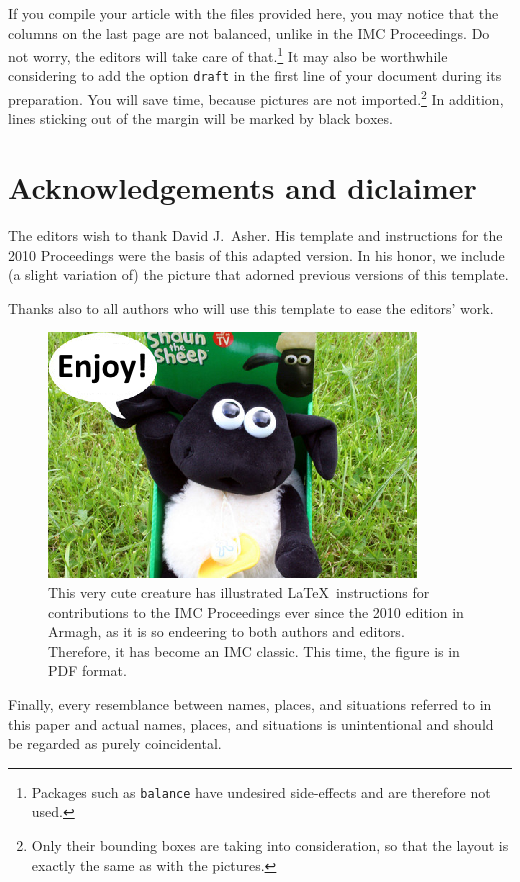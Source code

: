 \documentclass[10pt,a4paper,twoside]{article}
\begin{document}
\begin{IMCpaper}
If you compile your article with the files provided here, you may
notice that the columns on the last page are not balanced, unlike in
the IMC Proceedings. Do not worry, the editors will take care of
that.\footnote{Packages such as \texttt{balance} have undesired
  side-effects and are therefore not used.}  It may also be worthwhile
considering to add the option \texttt{draft} in the first line of your
document during its preparation. You will save time, because pictures
are not imported.\footnote{Only their bounding boxes are taking into
  consideration, so that the layout is exactly the same as with the
  pictures.} In addition, lines sticking out of the margin will be
marked by black boxes.

\section*{Acknowledgements and diclaimer}
The editors wish to thank David J.~Asher. His template and
instructions for the 2010 Proceedings were the basis of this adapted
version. In his honor, we include (a slight variation of) the picture
that adorned previous versions of this template.

Thanks also to all authors who will use this template to ease the
editors' work.

\begin{figure}[!t]
  \centering
\includegraphics[width = \columnwidth]{2018-L12-sheep-figure3}%
\vspace*{3pt}
\caption{This very cute creature has illustrated \LaTeX\ instructions
  for contributions to the IMC Proceedings ever since the 2010 edition in
  Armagh, as it is so endeering to both authors and
  editors. Therefore, it has become an IMC classic. This time, the
  figure is in PDF format.}%
\label{2018-L12-sheep-figure3}
\end{figure}

Finally, every resemblance between names, places, and situations
referred to in this paper and actual names, places, and situations is
unintentional and should be regarded as purely coincidental.

\nocite{*}



\end{IMCpaper}
\end{document}
